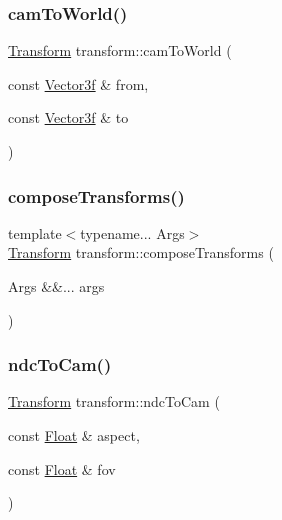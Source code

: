 \subsubsection{\texorpdfstring{camToWorld()}{camToWorld()}}
{\footnotesize\ttfamily \mbox{\hyperlink{classtransform_1_1Transform}{Transform}} transform\+::cam\+To\+World (\begin{DoxyParamCaption}\item[{const \mbox{\hyperlink{cyclop_8hpp_a5a0a2e85b081623ef3f7e7e8d43024f5}{Vector3f}} \&}]{from,  }\item[{const \mbox{\hyperlink{cyclop_8hpp_a5a0a2e85b081623ef3f7e7e8d43024f5}{Vector3f}} \&}]{to }\end{DoxyParamCaption})}

\mbox{\label{namespacetransform_a05a73ff0bc36879c17e55dd4d8f4f3d6}} 
\subsubsection{\texorpdfstring{composeTransforms()}{composeTransforms()}}
{\footnotesize\ttfamily template$<$typename... Args$>$ \\
\mbox{\hyperlink{classtransform_1_1Transform}{Transform}} transform\+::compose\+Transforms (\begin{DoxyParamCaption}\item[{Args \&\&...}]{args }\end{DoxyParamCaption})}

\mbox{\label{namespacetransform_aea5616d1baa596de73167e91dc13c335}} 
\subsubsection{\texorpdfstring{ndcToCam()}{ndcToCam()}}
{\footnotesize\ttfamily \mbox{\hyperlink{classtransform_1_1Transform}{Transform}} transform\+::ndc\+To\+Cam (\begin{DoxyParamCaption}\item[{const \mbox{\hyperlink{cyclop_8hpp_a07afd7094cb489cbd514c76e6f55d34f}{Float}} \&}]{aspect,  }\item[{const \mbox{\hyperlink{cyclop_8hpp_a07afd7094cb489cbd514c76e6f55d34f}{Float}} \&}]{fov }\end{DoxyParamCaption})}


